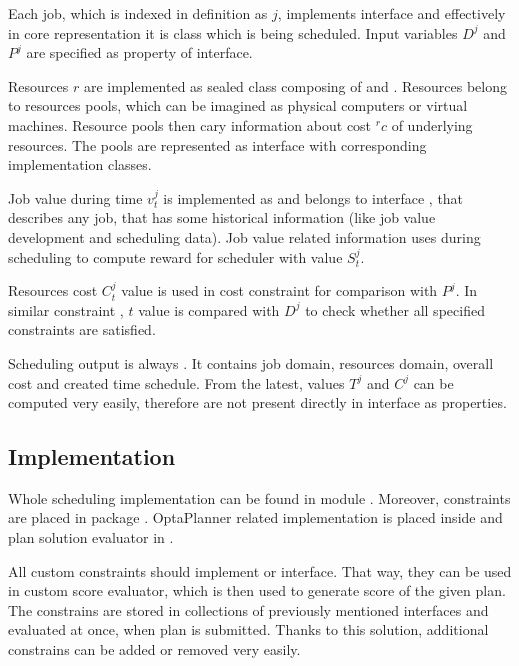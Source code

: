 Each job, which is indexed in definition as $j$,
implements  interface 
and effectively in core representation it is  class which is being scheduled.
Input variables $D^{j}$ and $P^{j}$ are specified as  property of  interface.

Resources $r$ are implemented as sealed class  composing of  and .
Resources belong to resources pools,
which can be imagined as physical computers or virtual machines.
Resource pools then cary information about cost ${}^{r}c$ of underlying resources.
The pools are represented as  interface with corresponding implementation classes.

Job value during time $v_{t}^{j}$ is implemented as 
and belongs to interface ,
that describes any job,
that has some historical information (like job value development and scheduling data).
Job value related information uses  during scheduling to compute reward for scheduler with value $S_{t}^{j}$.

Resources cost $C_{t}^{j}$ value is used in cost constraint  for comparison with $P^{j}$.
In similar constraint , $t$ value is compared with $D^{j}$ to check whether all specified constraints are satisfied.

Scheduling output is always .
It contains job domain, resources domain, overall cost
and created time schedule.
From the latest, 
values $T^{j}$ and $C^{j}$ can be computed very easily,
therefore are not present directly in interface as properties.

\subsection{Implementation}
Whole scheduling implementation can be found in module .
Moreover, 
constraints are placed in package .
OptaPlanner related implementation is placed inside 
and plan solution evaluator in .

All custom constraints should implement  
or  interface.
That way, 
they can be used in custom score evaluator,
which is then used to generate score of the given plan.
The constrains are stored in collections of previously mentioned interfaces 
and evaluated at once, when plan is submitted.
Thanks to this solution,
additional constrains can be added or removed very easily.

